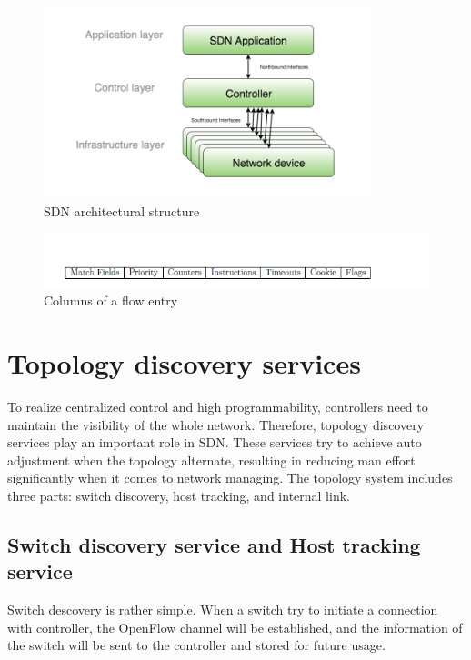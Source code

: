 \begin{figure}[H]
\begin{center} 
\includegraphics[width=0.85\textwidth]{figures/SDN_structure.png}
\end{center}
\caption{SDN architectural structure}
\label{SDN_struct}
\end{figure}

\begin{figure}[H]
\begin{center} 
\includegraphics[width=1\textwidth]{figures/columns_of_flow_entry.png}
\end{center}
\caption{Columns of a flow entry}
\label{FE_Col}
\end{figure}

\section{Topology discovery services}
\label{Topology discovery services}
To realize centralized control and high programmability, controllers need to maintain the visibility of the whole network. Therefore, topology discovery services play an important role in SDN. These services try to achieve auto adjustment when the topology alternate, resulting in reducing man effort significantly when it comes to network managing. The topology system includes three parts: switch discovery, host tracking, and internal link.

\subsection{Switch discovery service and Host tracking service}
Switch descovery is rather simple. When a switch try to initiate a connection with controller, the OpenFlow channel will be established, and the information of the switch will be sent to the controller and stored for future usage. 

